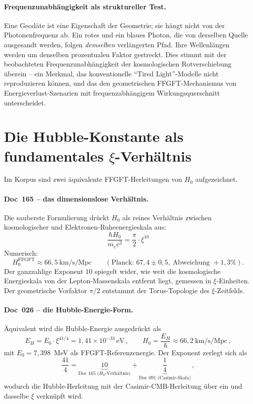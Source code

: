 \documentclass[11pt,a4paper]{article}
\begin{document}
\paragraph{Frequenzunabhängigkeit als struktureller Test.}
Eine Geodäte ist eine Eigenschaft der Geometrie; sie hängt nicht von der Photonenfrequenz ab. Ein rotes und ein blaues Photon, die von derselben Quelle ausgesandt werden, folgen \emph{demselben} verlängerten Pfad. Ihre Wellenlängen werden um denselben prozentualen Faktor gestreckt. Dies stimmt mit der beobachteten Frequenzunabhängigkeit der kosmologischen Rotverschiebung überein -- ein Merkmal, das konventionelle ``Tired Light''-Modelle nicht reproduzieren können, und das den geometrischen FFGFT-Mechanismus von Energieverlust-Szenarien mit frequenzabhängigem Wirkungsquerschnitt unterscheidet.

\section{Die Hubble-Konstante als fundamentales \texorpdfstring{$\xi$}{xi}-Verhältnis}

Im Korpus sind zwei äquivalente FFGFT-Herleitungen von $H_0$ aufgezeichnet.

\paragraph{Doc~165 -- das dimensionslose Verhältnis.} Die sauberste Formulierung drückt $H_0$ als reines Verhältnis zwischen kosmologischer und Elektronen-Ruheenergieskala aus:
\begin{equation}
\boxed{\;\frac{\hbar H_0}{m_e c^2} = \frac{\pi}{2}\cdot\xi^{10}\;}
\label{eq:h0_ratio}
\end{equation}
Numerisch:
\begin{equation}
H_0^{\mathrm{FFGFT}} \approx 66{,}5\ \text{km/s/Mpc} \qquad (\text{Planck: } 67{,}4 \pm 0{,}5,\ \text{Abweichung } +1{,}3\%).
\end{equation}
Der ganzzahlige Exponent $10$ spiegelt wider, wie weit die kosmologische Energieskala von der Lepton-Massenskala entfernt liegt, gemessen in $\xi$-Einheiten. Der geometrische Vorfaktor $\pi/2$ entstammt der Torus-Topologie des $\xi$-Zeitfelds.

\paragraph{Doc~026 -- die Hubble-Energie-Form.} Äquivalent wird die Hubble-Energie ausgedrückt als
\begin{equation}
E_H = E_0\cdot\xi^{41/4} = 1{,}41\times 10^{-33}\,\text{eV}\,, \qquad H_0 = \frac{E_H}{\hbar} \approx 66{,}2\ \text{km/s/Mpc}\,,
\label{eq:EH_026}
\end{equation}
mit $E_0 = 7{,}398$~MeV als FFGFT-Referenzenergie. Der Exponent zerlegt sich als
\begin{equation}
\frac{41}{4} = \underbrace{10}_{\text{Doc 165 (}H_0\text{-Verhältnis)}} + \underbrace{\frac{1}{4}}_{\text{Doc 091 (Casimir-Skala)}}\,,
\end{equation}
wodurch die Hubble-Herleitung mit der Casimir-CMB-Herleitung über ein und dasselbe $\xi$ verknüpft wird.
\end{document}
